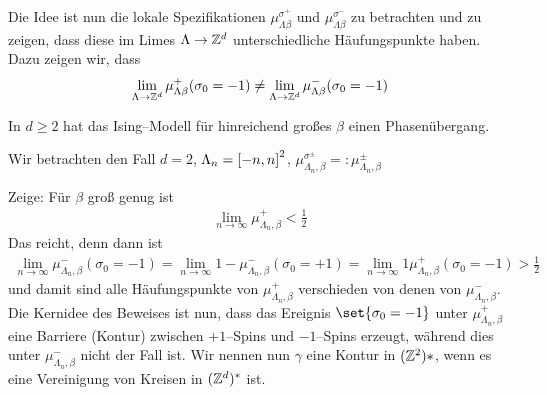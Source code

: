 Die Idee ist nun die lokale Spezifikationen $\mu_{\Lambda\beta}^{\sigma^+}$ und $\mu_{\Lambda\beta}^{\sigma^-}$ zu betrachten und zu zeigen, dass diese im Limes $\Lambda \to \mathbb{Z}^d$ unterschiedliche Häufungspunkte haben. Dazu zeigen wir, dass 
\begin{align}
	\lim\limits_{\Lambda \to \mathbb{Z}^d} \mu_{\Lambda \beta}^+ (\sigma_0 = -1) \neq \lim\limits_{\Lambda \to \mathbb{Z}^d} \mu_{\Lambda \beta}^- (\sigma_0 = -1) 
\end{align}
\begin{satz}[Peierls 1936]
	In $d \geq 2$ hat das Ising--Modell für hinreichend großes $\beta$ einen Phasenübergang. 
\end{satz}
\begin{beweis}
	Wir betrachten den Fall $d=2$, $\Lambda_n = \left\lbrack-n,n\right\rbrack^2$, $\mu_{\Lambda_n, \beta}^{\sigma^{\pm}} =: \mu_{\Lambda_n, \beta}^{\pm}$
	
	Zeige: Für $\beta$ groß genug ist 
	\begin{align}
		\lim\limits_{n \to \infty }\mu_{\Lambda_n, \beta}^{+} < \frac{1}{2}
	\end{align}
	Das reicht, denn dann ist
	\begin{align}
		\lim\limits_{n \to \infty} \mu_{\Lambda_n, \beta}^{-} (\sigma_0 = -1) = \lim\limits_{n \to \infty} 1 - \mu_{\Lambda_n, \beta}^{-} (\sigma_0 = +1) = \lim\limits_{n \to \infty} 1 \mu_{\Lambda_n, \beta}^{+} (\sigma_0  = -1) > \frac{1}{2}
	\end{align}
	und damit sind alle Häufungspunkte von $\mu_{\Lambda_n, \beta}^{+}$ verschieden von denen von $\mu_{\Lambda_n, \beta}^{-}$.
	Die Kernidee des Beweises ist nun, dass das Ereignis $\set{\sigma_0 = -1}$ unter $\mu_{\Lambda_n, \beta}^{+}$ eine Barriere (Kontur) zwischen $+1$--Spins und $-1$--Spins erzeugt, während dies unter $\mu_{\Lambda_n, \beta}^{-}$ nicht der Fall ist. Wir nennen nun $\gamma$ eine Kontur in $(\mathbb{Z}^2)*$, wenn es eine Vereinigung von Kreisen in $(\mathbb{Z}^d)^*$ ist. 
	

\end{beweis}
